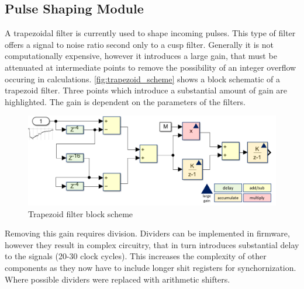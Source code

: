 \documentclass[a4paper,12pt,table]{article}
\begin{document}
	\subsection{Pulse Shaping Module}\label{ssec:pulse_shaping_module}
		A trapezoidal filter is currently used to shape incoming pulses. 
		This type of filter offers a signal to noise ratio second only to a cusp filter.
		Generally it is not computationally expensive, however it introduces a large gain, 
		that must be attenuated at intermediate points 
		to remove the possibility of an integer overflow occuring in calculations.
		\autoref{fig:trapezoid_scheme} shows a block schematic of a trapezoid filter. 
		Three points which introduce a substantial amount of gain are highlighted.
		The gain is dependent on the parameters of the filters.
		\begin{figure}[!hb]
			\centering
			\includegraphics[width=\textwidth]{img/trapezoid_schematic.png}
			\caption{Trapezoid filter block scheme}\label{fig:trapezoid_scheme}
		\end{figure}
		Removing this gain requires division.
		Dividers can be implemented in firmware, however they result in complex circuitry,
		that in turn introduces substantial delay to the signals (20-30 clock cycles). 
		This increases the complexity of other components as they now have to include
		longer shit registers for synchornization.
		Where possible dividers were replaced with arithmetic shifters. 
\end{document}
